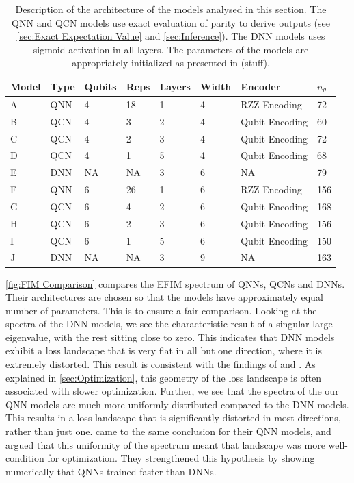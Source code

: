 \begin{table}[H]
\centering
\begin{tabular}{|l|l|l|l|l|l|l|l|}
\hline
Model &Type & Qubits& Reps & Layers & Width & Encoder        & $n_{\theta}$ \\ \hline
A    & QNN & 4& 18   & 1      & 4     & RZZ Encoding   & 72  \\ \hline
B    & QCN & 4& 3    & 2      & 4     & Qubit Encoding & 60 \\ \hline
C    & QCN & 4& 2    & 3      & 4     & Qubit Encoding & 72  \\ \hline
D    & QCN & 4& 1    & 5      & 4     & Qubit Encoding & 68  \\ \hline
E    & DNN & NA& NA   & 3      & 6     & NA             & 79 \\ \hline
F    & QNN & 6& 26   & 1      & 6     & RZZ Encoding   & 156  \\ \hline
G    & QCN & 6& 4    & 2      & 6     & Qubit Encoding & 168 \\ \hline
H    & QCN & 6& 2    & 3      & 6     & Qubit Encoding & 156  \\ \hline
I    & QCN & 6& 1    & 5      & 6     & Qubit Encoding & 150  \\ \hline
J    & DNN & NA& NA   & 3      & 9     & NA             & 163 \\ \hline
\end{tabular}
\caption{Description of the architecture of the models analysed in this section. The QNN and QCN models use exact evaluation of parity to derive outputs (see \autoref{sec:Exact Expectation Value} and \autoref{sec:Inference}). The DNN models uses sigmoid activation in all layers. The parameters of the models are appropriately initialized as presented in (stuff).} 
\label{tab:FIM models}
\end{table}

\autoref{fig:FIM Comparison} compares the EFIM spectrum of QNNs, QCNs and DNNs. Their architectures are chosen so that the models have approximately equal number of parameters. This is to ensure a fair comparison. Looking at the spectra of the DNN models, we see the characteristic result of a singular large eigenvalue, with the rest sitting close to zero. This indicates that DNN models exhibit a loss landscape that is very flat in all but one direction, where it is extremely distorted. This result is consistent with the findings of \citet{abbas2020power} and \citet{karakida2019universal}. As explained in \autoref{sec:Optimization}, this geometry of the loss landscape is often associated with slower optimization. Further, we see that the spectra of the our QNN models are much more uniformly distributed compared to the DNN models. This results in a loss landscape that is significantly distorted in most directions, rather than just one. \citet{abbas2020power} came to the same conclusion for their QNN models, and argued that this uniformity of the spectrum meant that landscape was more well-condition for optimization. They strengthened this hypothesis by showing numerically that QNNs trained faster than DNNs. 

